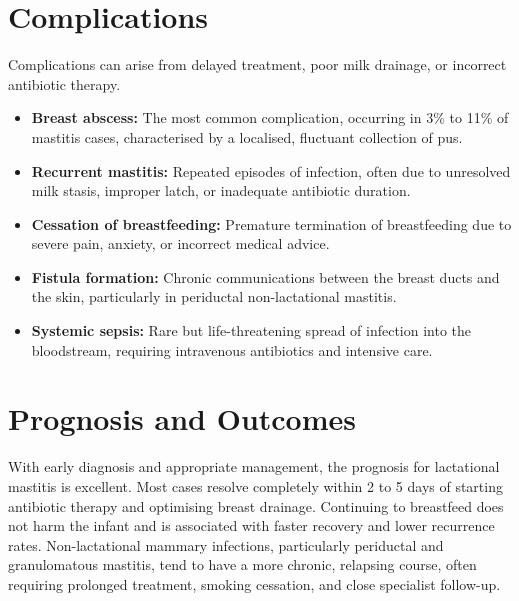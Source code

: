 \section*{Complications}
Complications can arise from delayed treatment, poor milk drainage, or incorrect antibiotic therapy.
\begin{itemize}
    \item \textbf{Breast abscess:} The most common complication, occurring in 3\% to 11\% of mastitis cases, characterised by a localised, fluctuant collection of pus.
    \item \textbf{Recurrent mastitis:} Repeated episodes of infection, often due to unresolved milk stasis, improper latch, or inadequate antibiotic duration.
    \item \textbf{Cessation of breastfeeding:} Premature termination of breastfeeding due to severe pain, anxiety, or incorrect medical advice.
    \item \textbf{Fistula formation:} Chronic communications between the breast ducts and the skin, particularly in periductal non-lactational mastitis.
    \item \textbf{Systemic sepsis:} Rare but life-threatening spread of infection into the bloodstream, requiring intravenous antibiotics and intensive care.
\end{itemize}

\section*{Prognosis and Outcomes}
With early diagnosis and appropriate management, the prognosis for lactational mastitis is excellent. Most cases resolve completely within 2 to 5 days of starting antibiotic therapy and optimising breast drainage. Continuing to breastfeed does not harm the infant and is associated with faster recovery and lower recurrence rates. Non-lactational mammary infections, particularly periductal and granulomatous mastitis, tend to have a more chronic, relapsing course, often requiring prolonged treatment, smoking cessation, and close specialist follow-up.

